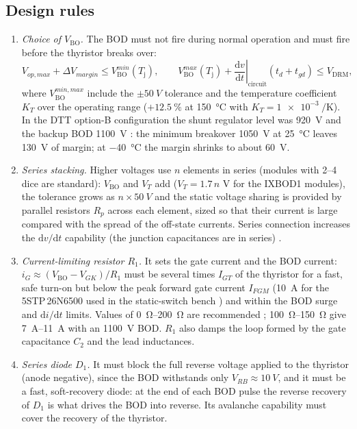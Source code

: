 \documentclass[11pt,a4paper]{article}
\newcommand{\Vbo}{V_{\mathrm{BO}}}
\newcommand{\Vdrm}{V_{\mathrm{DRM}}}
\newcommand{\Tj}{T_{\mathrm{j}}}
\newcommand{\dvdt}{\mathrm{d}v/\mathrm{d}t}
\begin{document}
\subsection{Design rules}
\begin{enumerate}
\item \emph{Choice of $\Vbo$.} The BOD must not fire during normal operation and must fire before the thyristor breaks over:
\begin{equation}
V_{op,max} + \Delta V_{margin} \le \Vbo^{min}(\Tj) , \qquad
\Vbo^{max}(\Tj) + \left.\frac{\mathrm{d}v}{\mathrm{d}t}\right|_{\text{circuit}} (t_d+t_{gd}) \le \Vdrm ,
\label{eq:vbo_choice}
\end{equation}
where $\Vbo^{min,max}$ include the $\pm\SI{50}{V}$ tolerance and the temperature coefficient $K_T$ over the operating range ($+\SI{12.5}{\percent}$ at \SI{150}{\celsius} with $K_T=\SI{1e-3}{\per\kelvin}$). In the DTT option-B configuration the shunt regulator level was \SI{920}{V} and the backup BOD \SI{1100}{V} \cite{crowbardtt}: the minimum breakover \SI{1050}{V} at \SI{25}{\celsius} leaves \SI{130}{V} of margin; at \SI{-40}{\celsius} the margin shrinks to about \SI{60}{V}.
\item \emph{Series stacking.} Higher voltages use $n$ elements in series (modules with 2--4 dice are standard): $\Vbo$ and $V_T$ add ($V_T = 1.7\,n$ V for the IXBOD1 modules), the tolerance grows as $n\times\SI{50}{V}$ and the static voltage sharing is provided by parallel resistors $R_p$ across each element, sized so that their current is large compared with the spread of the off-state currents. Series connection increases the $\dvdt$ capability (the junction capacitances are in series) \cite{ixysapp}.
\item \emph{Current-limiting resistor $R_1$.} It sets the gate current and the BOD current: $i_G \approx (\Vbo - V_{GK})/R_1$ must be several times $I_{GT}$ of the thyristor for a fast, safe turn-on but below the peak forward gate current $I_{FGM}$ (\SI{10}{A} for the 5STP\,26N6500 used in the static-switch bench \cite{crowbarself}) and within the BOD surge and $\mathrm{d}i/\mathrm{d}t$ limits. Values of \SIrange{0}{200}{\ohm} are recommended \cite{ixysapp}; \SIrange{100}{150}{\ohm} give \SIrange{7}{11}{A} with an \SI{1100}{V} BOD. $R_1$ also damps the loop formed by the gate capacitance $C_2$ and the lead inductances.
\item \emph{Series diode $D_1$.} It must block the full reverse voltage applied to the thyristor (anode negative), since the BOD withstands only $V_{RB}\approx\SI{10}{V}$, and it must be a fast, soft-recovery diode: at the end of each BOD pulse the reverse recovery of $D_1$ is what drives the BOD into reverse. Its avalanche capability must cover the recovery of the thyristor.

\end{enumerate}
\end{document}
